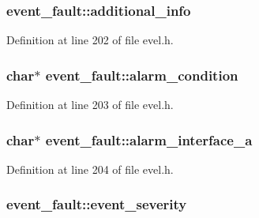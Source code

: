\subsubsection[{additional\+\_\+info}]{ event\+\_\+fault\+::additional\+\_\+info}\label{structevent__fault_a68765630c9cb8e88a482778e0bab551d}


Definition at line 202 of file evel.\+h.

\hypertarget{structevent__fault_ad8cee6bd12f2cd91f2c6e5b26b6fe99a}{}
\subsubsection[{alarm\+\_\+condition}]{\setlength{\rightskip}{0pt plus 5cm}char$\ast$ event\+\_\+fault\+::alarm\+\_\+condition}\label{structevent__fault_ad8cee6bd12f2cd91f2c6e5b26b6fe99a}


Definition at line 203 of file evel.\+h.

\hypertarget{structevent__fault_aa41c0fa6282ea720a91b0ac8af017852}{}
\subsubsection[{alarm\+\_\+interface\+\_\+a}]{\setlength{\rightskip}{0pt plus 5cm}char$\ast$ event\+\_\+fault\+::alarm\+\_\+interface\+\_\+a}\label{structevent__fault_aa41c0fa6282ea720a91b0ac8af017852}


Definition at line 204 of file evel.\+h.

\hypertarget{structevent__fault_a9d3b19de8267d39bc6cd30d00fc8d00b}{}
\subsubsection[{event\+\_\+severity}]{ event\+\_\+fault\+::event\+\_\+severity}\label{structevent__fault_a9d3b19de8267d39bc6cd30d00fc8d00b}


